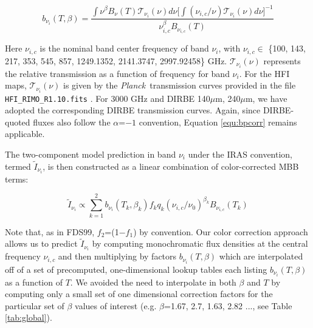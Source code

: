 \documentclass{emulateapj}
\newcommand{\PLANCK}{{\it Planck}}
\begin{document}

\begin{equation} \label{equ:bpcorr}
b_{\nu_i}(T, \beta) = \frac{\int \nu^{\beta}B_{\nu}(T)\mathcal{T}_{\nu_i}(\nu) d\nu \bigg[\int (\nu_{i,c}/\nu)\mathcal{T}_{\nu_i}(\nu) d\nu\bigg]^{-1}}{\nu_{i,c}^{\beta}B_{\nu_{i,c}}(T)}
\end{equation}


Here $\nu_{i,c}$ is the nominal band center frequency of band $\nu_i$,  with 
$\nu_{i,c} \in$ \{100, 143, 217, 353, 545, 857, 1249.1352, 2141.3747, 
2997.92458\} GHz. $\mathcal{T}_{\nu_i}(\nu)$ represents the relative 
transmission as a function of frequency for band $\nu_i$. For the HFI maps, 
$\mathcal{T}_{\nu_i}(\nu)$ is given by the \PLANCK~transmission curves provided
in the file \verb|HFI_RIMO_R1.10.fits| \citep{planckresponse}. For 3000 GHz and
DIRBE 140$\mu$m, 240$\mu$m, we have adopted the corresponding DIRBE 
transmission curves. Again, since DIRBE-quoted fluxes also follow the 
$\alpha$=$-1$ convention, Equation \ref{equ:bpcorr} remains applicable.



The two-component model prediction in band $\nu_i$ under the IRAS convention, 
termed $\tilde{I}_{\nu_i}$, is then constructed as a linear combination of 
color-corrected MBB terms:

\begin{equation} \label{equ:iras}
\tilde{I}_{\nu_i} \propto \sum_{k=1}^{2} b_{\nu_i}(T_k, \beta_k) f_k q_k (\nu_{i,c}/\nu_0)^{\beta_k} B_{\nu_{i,c}}(T_k)
\end{equation}

Note that, as in FDS99, $f_2$=(1$-$$f_1$) by convention. Our color correction 
approach allows us to predict $\tilde{I}_{\nu_i}$ by computing monochromatic 
flux densities at the central frequency $\nu_{i,c}$ and then multiplying by 
factors $b_{\nu_i}(T, \beta)$ which are interpolated off of a set of 
precomputed, one-dimensional lookup tables each listing $b_{\nu_i}(T, \beta)$ 
as a function of $T$. We avoided the need to interpolate in both $\beta$ and 
$T$ by computing only a small set of one dimensional correction factors for the
particular set of $\beta$ values of interest (e.g. $\beta$=1.67, 2.7, 
1.63, 2.82 ..., see Table \ref{tab:global}).
\end{document}
